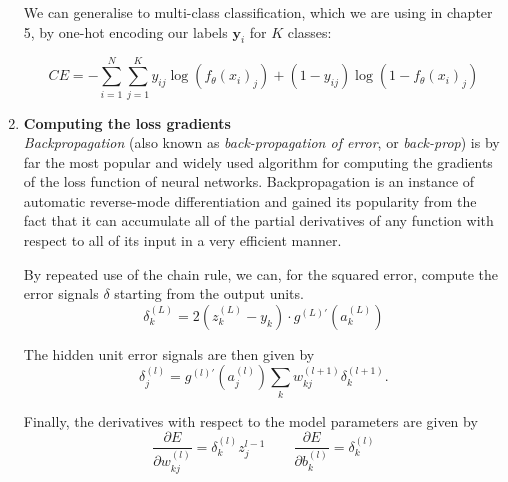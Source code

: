 \documentclass[bsc,frontabs,twoside,singlespacing,parskip,deptreport]{infthesis}     %
\begin{document}
\begin{enumerate}
We can generalise to multi-class classification, which we are using in chapter 5, by one-hot encoding our labels \(\mathbf{y}_{i}\) for \(K\) classes:

\begin{equation}
   CE = -\sum_{i=1}^{N} \sum_{j=1}^{K} y_{i j} \log \left(f_{\theta}\left(x_{i}\right)_{j}\right)+\left(1-y_{i j}\right) \log \left(1-f_{\theta}\left(x_{i}\right)_{j}\right)
\end{equation}

    
    \item{ \bf{Computing the loss gradients} } \\
    \textit{Backpropagation} (also known as \textit{back-propagation of error}, or \textit{back-prop}) \cite{rumelhart_learning_1986} is by far the most popular and widely used algorithm for computing the gradients of the loss function of neural networks. Backpropagation is an instance of automatic reverse-mode differentiation and gained its popularity from the fact that it can accumulate all of the partial derivatives of any function with respect to all of its input in a very efficient manner. 

By repeated use of the chain rule, we can, for the squared error, compute the error signals \(\delta\) starting from the output units.
\begin{equation}
    \delta_{k}^{(L)}=2\left(z_{k}^{(L)}-y_{k}\right) \cdot g^{(L)\prime}\left(a_{k}^{(L)}\right)
\end{equation}

The hidden unit error signals are then given by
\begin{equation}
    \delta_{j}^{(l)}=g^{(l)\prime}\left(a_{j}^{(l)}\right) \sum_{k} w_{k j}^{(l+1)} \delta_{k}^{(l+1)}.
\end{equation}


Finally, the derivatives with respect to the model parameters are given by
\begin{equation}
    \frac{\partial E}{\partial w_{k j}^{(l)}}=\delta_{k}^{(l)} z_{j}^{l-1} \quad\quad \frac{\partial E}{\partial b_{k}^{(l)}}=\delta_{k}^{(l)}
\end{equation}

    
    
    
    

\end{enumerate}
\end{document}
